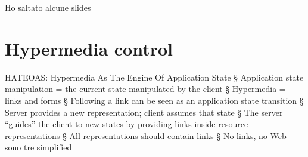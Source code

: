 Ho saltato alcune slides

\section*{Hypermedia control}
HATEOAS: Hypermedia As The Engine Of Application State
§ Application state manipulation = the current state manipulated by the client
§ Hypermedia = links and forms
§ Following a link can be seen as an application state transition
§ Server provides a new representation; client assumes that state
§ The server “guides” the client to new states by providing links inside resource representations
§ All representations should contain links
§ No links, no Web  
sono tre simplified